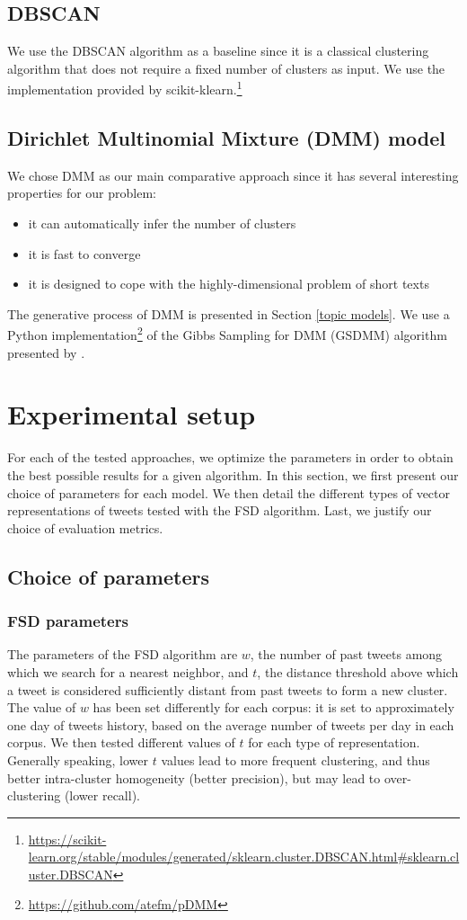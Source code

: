 \subsection{DBSCAN}
We use the DBSCAN algorithm \citep{ester1996density} as a baseline since it is a classical clustering algorithm that does not require a fixed number of clusters as input. We use the implementation provided by scikit-klearn.\footnote{\url{https://scikit-learn.org/stable/modules/generated/sklearn.cluster.DBSCAN.html\#sklearn.cluster.DBSCAN}}

\subsection{Dirichlet Multinomial Mixture (DMM) model}
We chose DMM as our main comparative approach since it has several interesting properties for our problem: \begin{itemize}
    \item it can automatically infer the number of clusters
    \item it is fast to converge
    \item it is designed to cope with the highly-dimensional problem of short texts
\end{itemize}

The generative process of DMM is presented in Section \ref{topic models}. We use a Python implementation\footnote{\url{https://github.com/atefm/pDMM}} of the Gibbs Sampling for DMM (GSDMM) algorithm presented by \citet{yin_dirichlet_2014}.

\section{Experimental setup}

For each of the tested approaches, we optimize the parameters in order to obtain the best possible results for a given algorithm. In this section, we first present our choice of parameters for each model. We then detail the different types of vector representations of tweets tested with the FSD algorithm. Last, we justify our choice of evaluation metrics.

\subsection{Choice of parameters}

\subsubsection{FSD parameters}
The parameters of the FSD algorithm are $w$, the number of past tweets among which we search for a nearest neighbor, and $t$, the distance threshold above which a tweet is considered sufficiently distant from past tweets to form a new cluster. The value of $w$ has been set differently for each corpus: it is set to approximately one day of tweets history, based on the average number of tweets per day in each corpus. We then tested different values of $t$ for each type of representation. Generally speaking, lower $t$ values lead to more frequent clustering, and thus better intra-cluster homogeneity (better precision), but may lead to over-clustering (lower recall).


